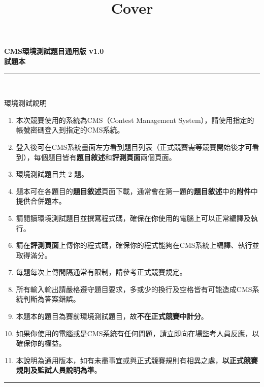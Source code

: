 \documentclass[a4paper]{article}
\title{Cover}
\begin{document}
\begin{center}
\textbf{\huge CMS環境測試題目通用版 v1.0}\\
\vspace{5mm}
\textbf{\huge 試題本}\\
\vspace{10mm}
\rule{17cm}{2pt}\\
\vspace{5mm}

\huge 環境測試說明\\
\end{center}

\fontsize{14pt}{20pt}\selectfont
\begin{enumerate}
    \setlength\itemsep{0.5pt}
    \item 本次競賽使用的系統為CMS（Contest Management System），請使用指定的帳號密碼登入到指定的CMS系統。
    \item 登入後可在CMS系統畫面左方看到題目列表（正式競賽需等競賽開始後才可看到），每個題目皆有\textbf{題目敘述}和\textbf{評測頁面}兩個頁面。
    \item 環境測試題目共 2 題。
    \item 題本可在各題目的\textbf{題目敘述}頁面下載，通常會在第一題的\textbf{題目敘述}中的\textbf{附件}中提供合併題本。
    \item 請閱讀環境測試題目並撰寫程式碼，確保在你使用的電腦上可以正常編譯及執行。
    \item 請在\textbf{評測頁面}上傳你的程式碼，確保你的程式能夠在CMS系統上編譯、執行並取得滿分。
    \item 每題每次上傳間隔通常有限制，請參考正式競賽規定。
    \item 所有輸入輸出請嚴格遵守題目要求，多或少的換行及空格皆有可能造成CMS系統判斷為答案錯誤。
    \item 本題本的題目為賽前環境測試題目，故\textbf{不在正式競賽中計分}。
    \item 如果你使用的電腦或是CMS系統有任何問題，請立即向在場監考人員反應，以確保你的權益。
    \item 本說明為通用版本，如有未盡事宜或與正式競賽規則有相異之處，\textbf{以正式競賽規則及監試人員說明為準}。

\end{enumerate}

\begin{center}
\rule{17cm}{2pt}\\
\end{center}
\end{document}

